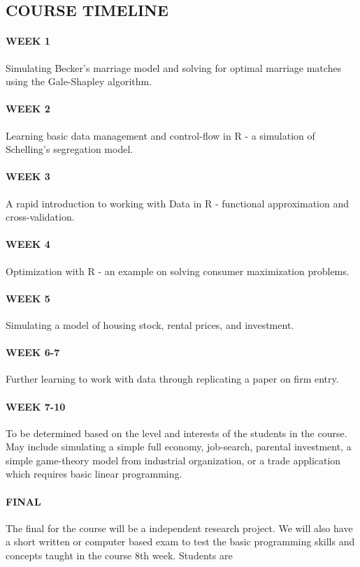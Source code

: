 \documentclass{scrartcl}
\begin{document}
\subsection*{COURSE TIMELINE}


\paragraph{WEEK 1}
Simulating Becker's marriage model and solving for optimal marriage matches using the Gale-Shapley algorithm.

\paragraph{WEEK 2}
Learning basic data management and control-flow in R - a simulation of Schelling's segregation model.

\paragraph{WEEK 3} 
A rapid introduction to working with Data in R - functional approximation and cross-validation. 

\paragraph{WEEK 4}
Optimization with R - an example on solving consumer maximization problems. 

\paragraph{WEEK 5}
Simulating a model of housing stock, rental prices, and investment. 

\paragraph{WEEK 6-7}
Further learning to work with data through replicating a paper on firm entry. 

\paragraph{WEEK 7-10}
To be determined based on the level and interests of the students in the course. May include simulating a simple full economy, job-search, parental investment, a simple game-theory model from industrial organization, or a trade application which requires basic linear programming. 

\paragraph{FINAL}
The final for the course will be a independent research project. We will also have a short written or computer based exam to test the basic programming skills and concepts taught in the course 8th week. Students are 
\end{document}
